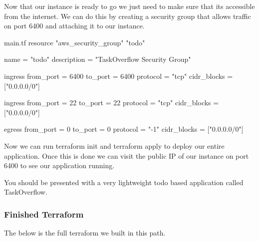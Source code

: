 \documentclass{csse4400}
\begin{document}

Now that our instance is ready to go we just need to make sure that its accessible from the internet. We can do this by creating a security group that allows traffic on port 6400 and attaching it to our instance.

\begin{code}[language=terraform,numbers=none]{main.tf}
  resource "aws_security_group" "todo" {
    name = "todo"
    description = "TaskOverflow Security Group"
  
    ingress {
      from_port = 6400
      to_port = 6400
      protocol = "tcp"
      cidr_blocks = ["0.0.0.0/0"]
    }
  
    ingress {
      from_port = 22
      to_port = 22
      protocol = "tcp"
      cidr_blocks = ["0.0.0.0/0"]
    }
  
    egress {
      from_port = 0
      to_port = 0
      protocol = "-1"
      cidr_blocks = ["0.0.0.0/0"]
    }
  }
\end{code}

Now we can run terraform init and terraform apply to deploy our entire application. Once this is done we can visit the public IP of our instance on port 6400 to see our application running.


You should be presented with a very lightweight todo based application called TaskOverflow.

\subsubsection{Finished Terraform}

The below is the full terraform we built in this path.
\end{document}
